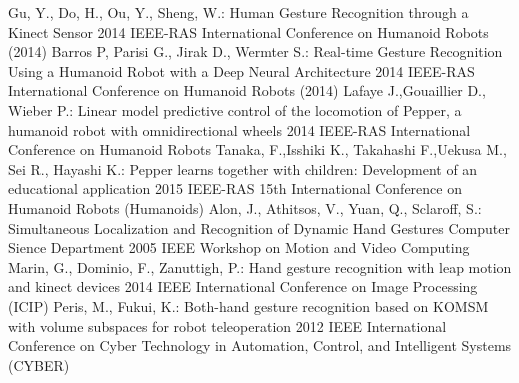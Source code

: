\documentclass{llncs}
\begin{document}
\begin{thebibliography}{[MT1]}
Gu, Y., Do, H., Ou, Y., Sheng, W.:
Human Gesture Recognition through a Kinect Sensor
2014 IEEE-RAS International Conference on Humanoid Robots (2014)
Barros P, Parisi G., Jirak D., Wermter S.:
Real-time Gesture Recognition Using a Humanoid Robot with a Deep Neural Architecture 2014 IEEE-RAS International Conference on Humanoid Robots (2014)
Lafaye J.,Gouaillier D., Wieber P.:
Linear model predictive control of the locomotion of Pepper, a humanoid robot with omnidirectional wheels 2014 IEEE-RAS International Conference on Humanoid Robots%
Tanaka, F.,Isshiki K., Takahashi F.,Uekusa M., Sei R., Hayashi K.:
Pepper learns together with children: Development of an educational application 2015 IEEE-RAS 15th International Conference on Humanoid Robots (Humanoids)
Alon, J., Athitsos, V., Yuan, Q., Sclaroff, S.:
Simultaneous Localization and Recognition of Dynamic Hand Gestures Computer Sience Department 2005 IEEE Workshop on Motion and Video Computing
Marin, G., Dominio, F., Zanuttigh, P.:
Hand gesture recognition with leap motion and kinect devices 2014 IEEE International Conference on Image Processing (ICIP)
Peris, M., Fukui, K.:
Both-hand gesture recognition based on KOMSM with volume subspaces for robot teleoperation 2012 IEEE International Conference on Cyber Technology in Automation, Control, and Intelligent Systems (CYBER)
\end{thebibliography}
\end{document}

